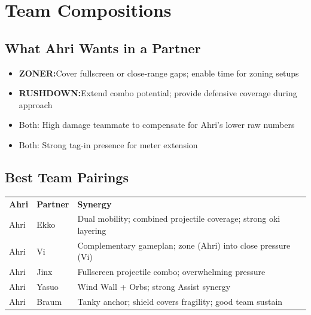 \documentclass[12pt, a4paper]{report}
\newcommand{\zoner}{\textcolor{ahriCyan}{\bfseries\sffamily{\small $\blacktriangleright$} ZONER:}\;}
\newcommand{\rushdown}{\textcolor{ahriMagenta}{\bfseries\sffamily{\small $\blacktriangleright$} RUSHDOWN:}\;}
\begin{document}
\clearpage

\chapter{Team Compositions}

\section{What Ahri Wants in a Partner}

\begin{itemize}
  \item \zoner Cover fullscreen or close-range gaps; enable time for zoning setups
  \item \rushdown Extend combo potential; provide defensive coverage during approach
  \item Both: High damage teammate to compensate for Ahri's lower raw numbers
  \item Both: Strong tag-in presence for meter extension
\end{itemize}

\section{Best Team Pairings}

\begin{center}
\begin{tabularx}{\linewidth}{C{2.5cm} C{2.5cm} L{9cm}}
\textcolor{ahriCyan}{\textbf{Ahri}} & \textcolor{ahriCyan}{\textbf{Partner}} & \textcolor{ahriCyan}{\textbf{Synergy}} \\
Ahri & Ekko & Dual mobility; combined projectile coverage; strong oki layering \\
Ahri & Vi & Complementary gameplan; zone (Ahri) into close pressure (Vi) \\
Ahri & Jinx & Fullscreen projectile combo; overwhelming pressure \\
Ahri & Yasuo & Wind Wall + Orbs; strong Assist synergy \\
Ahri & Braum & Tanky anchor; shield covers fragility; good team sustain \\
\end{tabularx}
\end{center}
\end{document}

